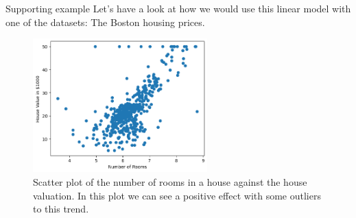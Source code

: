 \documentclass[10pt]{beamer}
\begin{document}
\begin{frame}[label={sec:org0c30073}]{Supporting example}
Let's have a look at how we would use this linear model with one of the datasets: The
Boston housing prices.

\begin{figure}[htbp]
\centering
\includegraphics[width=0.6\textwidth]{images/boston_rooms_prices.png}
\caption{Scatter plot of the number of rooms in a house against the house valuation. In this plot we can see a positive effect with some outliers to this trend.}
\end{figure}
\end{frame}
\end{document}
